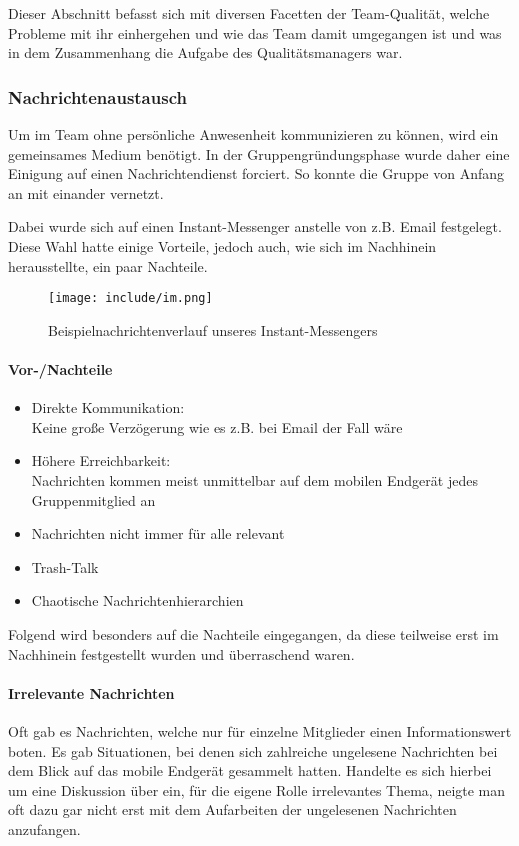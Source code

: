 Dieser Abschnitt befasst sich mit diversen Facetten der Team-Qualität, welche Probleme mit ihr einhergehen und wie das Team damit umgegangen ist und was in dem Zusammenhang die Aufgabe des Qualitätsmanagers war.

\subsubsection{Nachrichtenaustausch}
Um im Team ohne persönliche Anwesenheit kommunizieren zu können, wird ein gemeinsames Medium benötigt. In der Gruppengründungsphase wurde daher eine Einigung auf einen Nachrichtendienst forciert. So konnte die Gruppe von Anfang an mit einander vernetzt.

Dabei wurde sich auf einen Instant-Messenger anstelle von z.B. Email festgelegt. Diese Wahl hatte einige Vorteile, jedoch auch, wie sich im Nachhinein herausstellte, ein paar Nachteile.
\begin{figure}[!ht]
\centering
\texttt{[image: include/im.png]}
\label{fig:im}
\caption{Beispielnachrichtenverlauf unseres Instant-Messengers}
\end{figure}
\paragraph{Vor-/Nachteile}
\begin{itemize}[label=(+)]
     \item Direkte Kommunikation:\\
     Keine große Verzögerung wie es z.B. bei Email der Fall wäre
     \item Höhere Erreichbarkeit:\\
     Nachrichten  kommen meist unmittelbar auf dem mobilen Endgerät jedes Gruppenmitglied an
\end{itemize}
\begin{itemize}[label=(-)]
     \item Nachrichten nicht immer für alle relevant
     \item Trash-Talk
     \item Chaotische Nachrichtenhierarchien
\end{itemize}
Folgend wird besonders auf die Nachteile eingegangen, da diese teilweise erst im Nachhinein festgestellt wurden und überraschend waren.
\paragraph{Irrelevante Nachrichten}
Oft gab es Nachrichten, welche nur für einzelne Mitglieder einen Informationswert boten. Es gab Situationen, bei denen sich zahlreiche ungelesene Nachrichten bei dem Blick auf das mobile Endgerät gesammelt hatten. Handelte es sich hierbei um eine Diskussion über ein, für die eigene Rolle irrelevantes Thema, neigte man oft dazu gar nicht erst mit dem Aufarbeiten der ungelesenen Nachrichten anzufangen.
